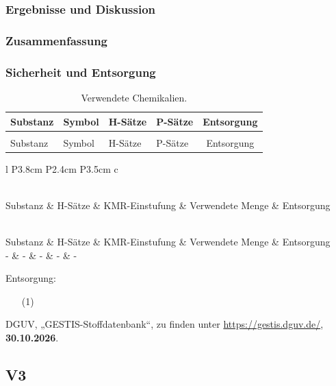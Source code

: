 \documentclass[
	a4paper,										%
	12pt,											%
	twoside,										%
	headsepline,								%
	footsepline,									%
	captions=tableheading,					%
]{scrartcl}
\newcommand{\langetabelle}[6]{  %
	\begin{centering}           %
		{\begin{longtable}[#3]{#4}
				\caption{#2\label{tab: #1}}\\				
				\hline
				#5
				\hline
				\endfirsthead
                \caption{#2\label{tab: #1}}\\
				\hline
				#5
				\hline
				\endhead
				#6												
				\hline 
		\end{longtable}}
\end{centering}}
\begin{document}
\subsubsection{Ergebnisse und Diskussion}

\subsubsection{Zusammenfassung}

\subsubsection{Sicherheit und Entsorgung}
		
\langetabelle
	{Chemikalien2}
	{Verwendete Chemikalien.}
	{H}  %
	{l p{1.9cm} p{2.2cm} p{4.5cm} c}
	{Substanz & Symbol & H-Sätze & P-Sätze & Entsorgung \\}
	{ %

    }

\langetabelle
	{KMR_leer2}
	{Verwendete kanzerogene, mutagene oder reproduktionstoxische Gefahrstoffe (KMR).}
	{H}
	{l P{3.8cm} P{2.4cm} P{3.5cm} c}
	{Substanz & H-Sätze & KMR-Einstufung & Verwendete Menge & Entsorgung \\}
	{ - & - & - & - & - \\}
	
Entsorgung: \\
\begin{itemize}
    \item[(1)]
\end{itemize}	

\begin{thebibliography}{4}		%

	
						{DGUV}, 
						„{GESTIS-Stoffdatenbank}“, zu finden unter 
			\url		{https://gestis.dguv.de/}, 
			\textbf	{30.10.2026}.


\end{thebibliography}

\newpage

\setcounter{subsection}{2}							%
\setcounter{secnumdepth}{4}
	
\subsection{V3}
\end{document}
